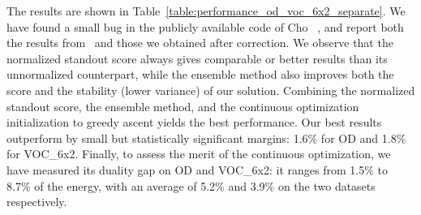 \documentclass[10pt,twocolumn,letterpaper]{article}
\numberwithin{theorem}{section}
\begin{document}
The results are shown in
Table~\ref{table:performance_od_voc_6x2_separate}. We have found a small bug in the publicly available code
of Cho \etal~\cite{CKSP15}, and report both the results from~\cite{CKSP15} and those we
obtained after correction. We observe that the normalized
standout score always gives comparable or better results than its
unnormalized counterpart, while the ensemble method also improves both the
score and the stability (lower variance) of our solution. Combining the normalized standout score, the ensemble method, and the continuous optimization initialization to greedy ascent yields the best performance. 
Our best results outperform \cite{CKSP15} by small but statistically significant margins: 1.6\% for OD and  1.8\% for VOC\_6x2.
Finally, to assess the merit of the continuous optimization, we have measured its duality gap on OD and VOC\_6x2: it ranges from 1.5\% to 8.7\% of the energy, with an average of 5.2\% and 3.9\% on  the two datasets respectively.



\begin{table}
\centering
{}
\vspace{-2mm}
\caption{\small Performance on VOC\_all in separate setting with different configurations.
}
\label{table:performance_voc_all_separate}
\vspace{-6mm}
\end{table}
\end{document}
